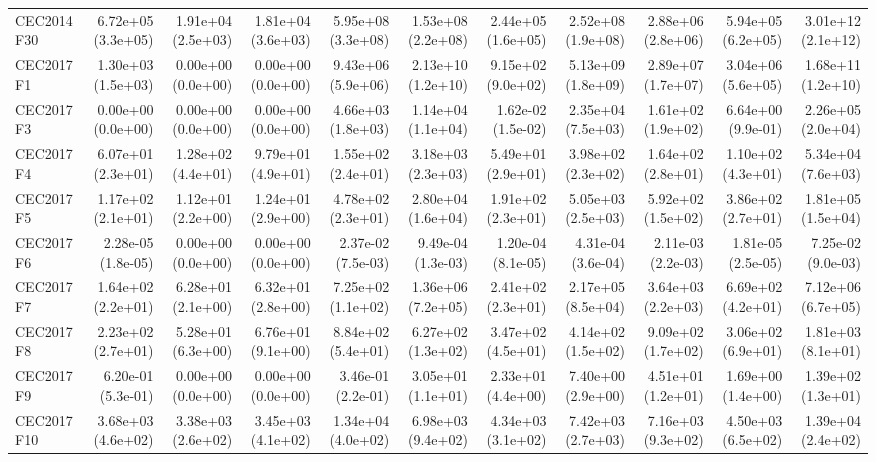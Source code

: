 \begin{longtable}{lrrrrrrrrrr}
CEC2014 F30 & 6.72e+05 (3.3e+05) & 1.91e+04 (2.5e+03) & 1.81e+04 (3.6e+03) & 5.95e+08 (3.3e+08) & 1.53e+08 (2.2e+08) & 2.44e+05 (1.6e+05) & 2.52e+08 (1.9e+08) & 2.88e+06 (2.8e+06) & 5.94e+05 (6.2e+05) & 3.01e+12 (2.1e+12) \\
CEC2017 F1 & 1.30e+03 (1.5e+03) & 0.00e+00 (0.0e+00) & 0.00e+00 (0.0e+00) & 9.43e+06 (5.9e+06) & 2.13e+10 (1.2e+10) & 9.15e+02 (9.0e+02) & 5.13e+09 (1.8e+09) & 2.89e+07 (1.7e+07) & 3.04e+06 (5.6e+05) & 1.68e+11 (1.2e+10) \\
CEC2017 F3 & 0.00e+00 (0.0e+00) & 0.00e+00 (0.0e+00) & 0.00e+00 (0.0e+00) & 4.66e+03 (1.8e+03) & 1.14e+04 (1.1e+04) & 1.62e-02 (1.5e-02) & 2.35e+04 (7.5e+03) & 1.61e+02 (1.9e+02) & 6.64e+00 (9.9e-01) & 2.26e+05 (2.0e+04) \\
CEC2017 F4 & 6.07e+01 (2.3e+01) & 1.28e+02 (4.4e+01) & 9.79e+01 (4.9e+01) & 1.55e+02 (2.4e+01) & 3.18e+03 (2.3e+03) & 5.49e+01 (2.9e+01) & 3.98e+02 (2.3e+02) & 1.64e+02 (2.8e+01) & 1.10e+02 (4.3e+01) & 5.34e+04 (7.6e+03) \\
CEC2017 F5 & 1.17e+02 (2.1e+01) & 1.12e+01 (2.2e+00) & 1.24e+01 (2.9e+00) & 4.78e+02 (2.3e+01) & 2.80e+04 (1.6e+04) & 1.91e+02 (2.3e+01) & 5.05e+03 (2.5e+03) & 5.92e+02 (1.5e+02) & 3.86e+02 (2.7e+01) & 1.81e+05 (1.5e+04) \\
CEC2017 F6 & 2.28e-05 (1.8e-05) & 0.00e+00 (0.0e+00) & 0.00e+00 (0.0e+00) & 2.37e-02 (7.5e-03) & 9.49e-04 (1.3e-03) & 1.20e-04 (8.1e-05) & 4.31e-04 (3.6e-04) & 2.11e-03 (2.2e-03) & 1.81e-05 (2.5e-05) & 7.25e-02 (9.0e-03) \\
CEC2017 F7 & 1.64e+02 (2.2e+01) & 6.28e+01 (2.1e+00) & 6.32e+01 (2.8e+00) & 7.25e+02 (1.1e+02) & 1.36e+06 (7.2e+05) & 2.41e+02 (2.3e+01) & 2.17e+05 (8.5e+04) & 3.64e+03 (2.2e+03) & 6.69e+02 (4.2e+01) & 7.12e+06 (6.7e+05) \\
CEC2017 F8 & 2.23e+02 (2.7e+01) & 5.28e+01 (6.3e+00) & 6.76e+01 (9.1e+00) & 8.84e+02 (5.4e+01) & 6.27e+02 (1.3e+02) & 3.47e+02 (4.5e+01) & 4.14e+02 (1.5e+02) & 9.09e+02 (1.7e+02) & 3.06e+02 (6.9e+01) & 1.81e+03 (8.1e+01) \\
CEC2017 F9 & 6.20e-01 (5.3e-01) & 0.00e+00 (0.0e+00) & 0.00e+00 (0.0e+00) & 3.46e-01 (2.2e-01) & 3.05e+01 (1.1e+01) & 2.33e+01 (4.4e+00) & 7.40e+00 (2.9e+00) & 4.51e+01 (1.2e+01) & 1.69e+00 (1.4e+00) & 1.39e+02 (1.3e+01) \\
CEC2017 F10 & 3.68e+03 (4.6e+02) & 3.38e+03 (2.6e+02) & 3.45e+03 (4.1e+02) & 1.34e+04 (4.0e+02) & 6.98e+03 (9.4e+02) & 4.34e+03 (3.1e+02) & 7.42e+03 (2.7e+03) & 7.16e+03 (9.3e+02) & 4.50e+03 (6.5e+02) & 1.39e+04 (2.4e+02) \\

\end{longtable}
